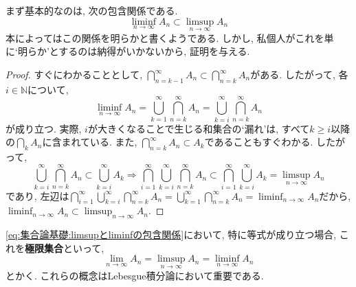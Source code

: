         まず基本的なのは, 次の包含関係である.
        \begin{equation}
            \liminf_{n\to\infty}A_n\subset\limsup_{n\to\infty}A_n \label{eq:集合論基礎:limsupとliminfの包含関係}
        \end{equation}
        本によってはこの関係を明らかと書くようである. しかし, 私個人がこれを単に`明らか'とするのは納得がいかないから, 証明を与える.
        \begin{proof}
            すぐにわかることとして, $\displaystyle \bigcap_{n=k-1}^\infty A_n\subset\bigcap_{n=k}^\infty A_n$がある. したがって, 各$i\in\mathbb{N}$について, 
            \begin{equation*}
                \liminf_{n\to\infty} A_n=\bigcup_{k=1}^{\infty}\bigcap_{n=k}^\infty A_n=\bigcup_{k=i}^{\infty}\bigcap_{n=k}^\infty A_n
            \end{equation*}
            が成り立つ. 実際, $i$が大きくなることで生じる和集合の`漏れ'は, すべて$k\geq i$以降の$\bigcap_{k} A_n$に含まれている.
            また, $\displaystyle \bigcap_{n=k}^\infty A_n\subset A_k$であることもすぐわかる. したがって, 
            \begin{equation*}
                \bigcup_{k=i}^{\infty}\bigcap_{n=k}^\infty A_n\subset \bigcup_{k=i}^{\infty}A_k\Rightarrow \bigcap_{i=1}^\infty\bigcup_{k=i}^{\infty}\bigcap_{n=k}^\infty A_n\subset \bigcap_{i=1}^\infty\bigcup_{k=i}^{\infty}A_k=\limsup_{n\to\infty}A_n
            \end{equation*}
            であり, 左辺は$\displaystyle \bigcap_{i=1}^\infty\bigcup_{k=i}^{\infty}\bigcap_{n=k}^\infty A_n=\bigcup_{k=1}^{\infty}\bigcap_{n=k}^\infty A_n=\liminf_{n\to\infty}A_n$だから, $\displaystyle\liminf_{n\to\infty}A_n\subset\limsup_{n\to\infty}A_n$.
        \end{proof}
        \eqref{eq:集合論基礎:limsupとliminfの包含関係}において, 特に等式が成り立つ場合, これを\textbf{極限集合}といって, 
        \begin{equation}
            \lim_{n\to\infty}A_n=\limsup_{n\to\infty}A_n=\liminf_{n\to\infty}A_n \label{eq:集合論基礎:極限集合の定義}
        \end{equation}
        とかく. これらの概念はLebesgue積分論において重要である.
        \clearpage


    \clearpage
